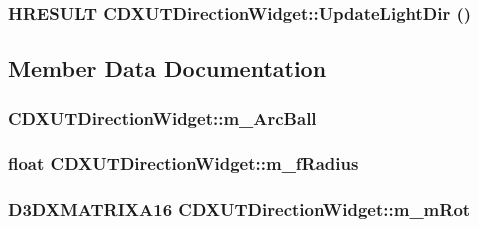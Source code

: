 \label{class_c_d_x_u_t_direction_widget_a22263fd07ccf18a43ffe2cfef4622eaf}
\hypertarget{class_c_d_x_u_t_direction_widget_a35dd2b18e3169755c5d13cb4b8da8ec6}{
\subsubsection[{UpdateLightDir}]{\setlength{\rightskip}{0pt plus 5cm}HRESULT CDXUTDirectionWidget::UpdateLightDir ()}}
\label{class_c_d_x_u_t_direction_widget_a35dd2b18e3169755c5d13cb4b8da8ec6}


\subsection{Member Data Documentation}
\hypertarget{class_c_d_x_u_t_direction_widget_a36404bb48b163d884cef2f72dfa05d2c}{
\subsubsection[{m\_\-ArcBall}]{ {\bf CDXUTDirectionWidget::m\_\-ArcBall}}}
\label{class_c_d_x_u_t_direction_widget_a36404bb48b163d884cef2f72dfa05d2c}
\hypertarget{class_c_d_x_u_t_direction_widget_a038de5f37cfd414d3abaa1f841d74235}{
\subsubsection[{m\_\-fRadius}]{\setlength{\rightskip}{0pt plus 5cm}float {\bf CDXUTDirectionWidget::m\_\-fRadius}}}
\label{class_c_d_x_u_t_direction_widget_a038de5f37cfd414d3abaa1f841d74235}
\hypertarget{class_c_d_x_u_t_direction_widget_acd8ea6dfee9ad0593f1dc33a9c6b27ba}{
\subsubsection[{m\_\-mRot}]{\setlength{\rightskip}{0pt plus 5cm}D3DXMATRIXA16 {\bf CDXUTDirectionWidget::m\_\-mRot}}}
